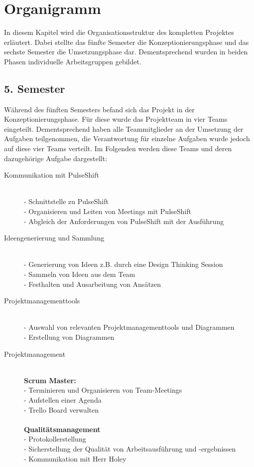 \section{Organigramm}

In diesem Kapitel wird die Organisationsstruktur des kompletten Projektes erläutert. Dabei stellte das fünfte Semester die Konzeptionierungsphase und das sechste Semester die Umsetzungsphase dar. Dementsprechend wurden in beiden Phasen individuelle Arbeitsgruppen gebildet.

\subsection{5. Semester}
Während des fünften Semesters befand sich das Projekt in der Konzeptionierungsphase. Für diese wurde das Projektteam in vier Teams eingeteilt. Dementsprechend haben alle Teammitglieder an der Umsetzung der Aufgaben teilgenommen, die Verantwortung für einzelne Aufgaben wurde jedoch auf diese vier Teams verteilt. Im Folgenden werden diese Teams und deren dazugehörige Aufgabe dargestellt:

\begin{description}
\item[Kommunikation mit PulseShift\\]\hfill \\
- Schnittstelle zu PulseShift\\
- Organisieren und Leiten von Meetings mit PulseShift\\
- Abgleich der Anforderungen von PulseShift mit der Ausführung


\item[Ideengenerierung und Sammlung]\hfill \\
- Generierung von Ideen z.B. durch eine Design Thinking Session\\
- Sammeln von Ideen aus dem Team\\
- Festhalten und Ausarbeitung von Ansätzen

\item[Projektmanagementtools]\hfill \\
	- Auswahl von relevanten Projektmanagementtools und Diagrammen\\
	- Erstellung von Diagrammen

\item[Projektmanagement]\hfill \\
	\textbf{Scrum Master:}\\
	\phantom{hue}- Terminieren und Organisieren von Team-Meetings\\
	\phantom{hue}- Aufstellen einer Agenda\\
	\phantom{hue}- Trello Board verwalten\\\\
	\textbf{Qualitätsmanagement}\\
	\phantom{hue}- Protokollerstellung\\
	\phantom{hue}- Sicherstellung der Qualität von Arbeitsausführung und -ergebnissen\\
	\phantom{hue}- Kommunikation mit Herr Holey
\end{description}

